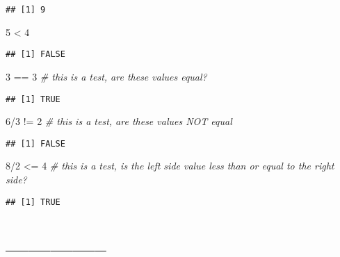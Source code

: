 \documentclass[
]{article}
\newenvironment{Shaded}{\begin{snugshade}}{\end{snugshade}}
\newcommand{\CommentTok}[1]{\textcolor[rgb]{0.56,0.35,0.01}{\textit{#1}}}
\newcommand{\DecValTok}[1]{\textcolor[rgb]{0.00,0.00,0.81}{#1}}
\newcommand{\SpecialCharTok}[1]{\textcolor[rgb]{0.00,0.00,0.00}{#1}}
\begin{document}
\begin{verbatim}
## [1] 9
\end{verbatim}

\begin{Shaded}
\begin{Highlighting}[]
\DecValTok{5} \SpecialCharTok{\textless{}} \DecValTok{4}
\end{Highlighting}
\end{Shaded}

\begin{verbatim}
## [1] FALSE
\end{verbatim}

\begin{Shaded}
\begin{Highlighting}[]
\DecValTok{3} \SpecialCharTok{==} \DecValTok{3}   \CommentTok{\# this is a test, are these values equal?}
\end{Highlighting}
\end{Shaded}

\begin{verbatim}
## [1] TRUE
\end{verbatim}

\begin{Shaded}
\begin{Highlighting}[]
\DecValTok{6}\SpecialCharTok{/}\DecValTok{3} \SpecialCharTok{!=} \DecValTok{2}  \CommentTok{\# this is a test, are these values NOT equal}
\end{Highlighting}
\end{Shaded}

\begin{verbatim}
## [1] FALSE
\end{verbatim}

\begin{Shaded}
\begin{Highlighting}[]
\DecValTok{8}\SpecialCharTok{/}\DecValTok{2} \SpecialCharTok{\textless{}=} \DecValTok{4}  \CommentTok{\# this is a test, is the left side value less than or equal to the right side?}
\end{Highlighting}
\end{Shaded}

\begin{verbatim}
## [1] TRUE
\end{verbatim}

\hypertarget{section-4}{%
\section{--------------}\label{section-4}}
\end{document}
